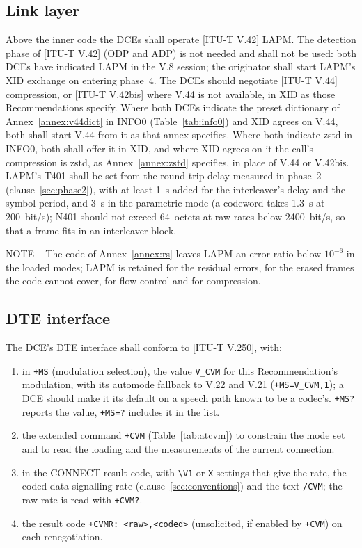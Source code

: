 \documentclass[a4paper,11pt]{article}
\newcounter{annex}
\newcommand{\itunote}[1]{\par{\small NOTE -- #1}\par}
\newcommand{\rec}[1]{[ITU-T #1]}
\newcommand{\code}[1]{\texttt{#1}}
\begin{document}
\subsection{Link layer}\label{sec:link}
Above the inner code the DCEs shall operate \rec{V.42} LAPM.  The
detection phase of \rec{V.42} (ODP and ADP) is not needed and shall not be
used: both DCEs have indicated LAPM in the V.8 session; the originator
shall start LAPM's XID exchange on entering phase~4.  The DCEs should
negotiate \rec{V.44} compression, or \rec{V.42bis} where V.44 is not
available, in XID as those Recommendations specify.  Where both DCEs
indicate the preset dictionary of Annex~\ref{annex:v44dict} in INFO0
(Table~\ref{tab:info0}) and XID agrees on V.44, both shall start
V.44 from it as that annex specifies.  Where both indicate zstd in
INFO0, both shall offer it in XID, and where XID agrees on it the call's
compression is zstd, as Annex~\ref{annex:zstd} specifies, in place of
V.44 or V.42bis.  LAPM's T401 shall be
set from the round-trip delay measured in phase~2 (clause~\ref{sec:phase2}),
with at least 1~s added for the interleaver's delay and the symbol
period, and 3~s in the parametric mode (a codeword takes 1.3~s at
200~bit/s); N401 should not exceed 64~octets at raw rates below
2400~bit/s, so that a frame fits in an interleaver block.

\itunote{The code of Annex~\ref{annex:rs} leaves LAPM an error ratio
below $10^{-6}$ in the loaded modes; LAPM is retained for the residual
errors, for the erased frames the code cannot cover, for flow control and
for compression.}

\subsection{DTE interface}
The DCE's DTE interface shall conform to \rec{V.250}, with:
\begin{enumerate}[label=\alph*)]
\item in \code{+MS} (modulation selection), the value \code{V\_CVM} for this
  Recommendation's modulation, with its automode fallback to V.22 and
  V.21 (\code{+MS=V\_CVM,1}); a DCE should make it its default on a speech
  path known to be a codec's.  \code{+MS?} reports the value, \code{+MS=?}
  includes it in the list.
\item the extended command \code{+CVM} (Table~\ref{tab:atcvm}) to constrain
  the mode set and to read the loading and the measurements of the
  current connection.
\item in the CONNECT result code, with \code{\textbackslash V1} or \code{X}
  settings that give the rate, the coded data signalling rate (clause~\ref{sec:conventions}) and the
  text \code{/CVM}; the raw rate is read with \code{+CVM?}.
\item the result code \code{+CVMR: <raw>,<coded>} (unsolicited, if enabled
  by \code{+CVM}) on each renegotiation.
\end{enumerate}
\end{document}
